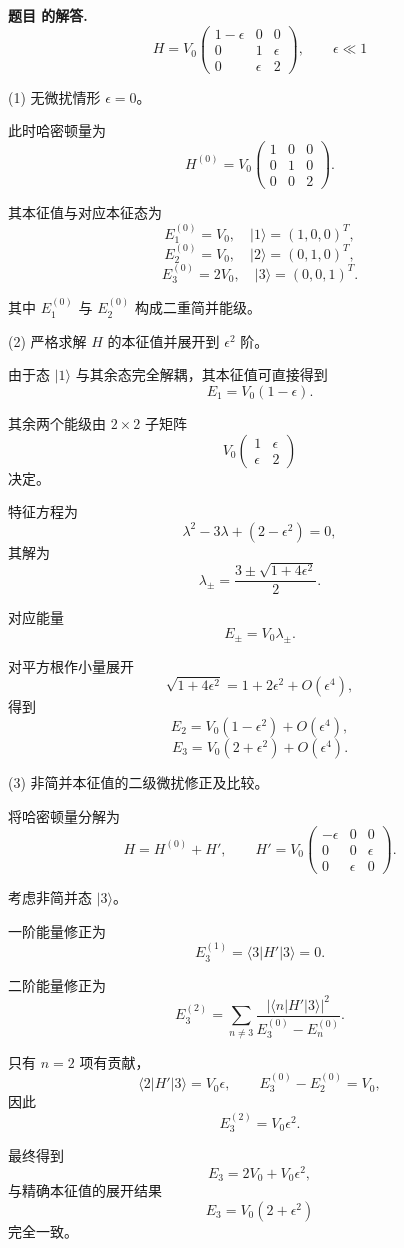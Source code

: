 \documentclass[12pt, a4paper, oneside]{ctexart}
\newcounter{problemname}
\newenvironment{solution}
  {\par\noindent\textbf{题目 \theproblemname 的解答. }}
  {\par}
\begin{document}
\begin{solution}
  \[
H = V_0
\begin{pmatrix}
1-\epsilon & 0 & 0 \\
0 & 1 & \epsilon \\
0 & \epsilon & 2
\end{pmatrix},
\qquad \epsilon \ll 1
\]

(1) 无微扰情形 $\epsilon=0$。

此时哈密顿量为
\[
H^{(0)} = V_0
\begin{pmatrix}
1 & 0 & 0 \\
0 & 1 & 0 \\
0 & 0 & 2
\end{pmatrix}.
\]

其本征值与对应本征态为
\[
E_1^{(0)} = V_0, \quad |1\rangle = (1,0,0)^T,
\]
\[
E_2^{(0)} = V_0, \quad |2\rangle = (0,1,0)^T,
\]
\[
E_3^{(0)} = 2V_0, \quad |3\rangle = (0,0,1)^T.
\]

其中 $E_1^{(0)}$ 与 $E_2^{(0)}$ 构成二重简并能级。

\bigskip

(2) 严格求解 $H$ 的本征值并展开到 $\epsilon^2$ 阶。

由于态 $|1\rangle$ 与其余态完全解耦，其本征值可直接得到
\[
E_1 = V_0(1-\epsilon).
\]

其余两个能级由 $2\times2$ 子矩阵
\[
V_0
\begin{pmatrix}
1 & \epsilon \\
\epsilon & 2
\end{pmatrix}
\]
决定。

特征方程为
\[
\lambda^2 - 3\lambda + (2-\epsilon^2)=0,
\]
其解为
\[
\lambda_{\pm}=\frac{3\pm\sqrt{1+4\epsilon^2}}{2}.
\]

对应能量
\[
E_{\pm}=V_0\lambda_{\pm}.
\]

对平方根作小量展开
\[
\sqrt{1+4\epsilon^2}=1+2\epsilon^2+O(\epsilon^4),
\]
得到
\[
E_2 = V_0(1-\epsilon^2)+O(\epsilon^4),
\]
\[
E_3 = V_0(2+\epsilon^2)+O(\epsilon^4).
\]

\bigskip

(3) 非简并本征值的二级微扰修正及比较。

将哈密顿量分解为
\[
H = H^{(0)} + H',
\qquad
H' = V_0
\begin{pmatrix}
-\epsilon & 0 & 0 \\
0 & 0 & \epsilon \\
0 & \epsilon & 0
\end{pmatrix}.
\]

考虑非简并态 $|3\rangle$。

一阶能量修正为
\[
E_3^{(1)}=\langle 3|H'|3\rangle=0.
\]

二阶能量修正为
\[
E_3^{(2)}=\sum_{n\neq3}\frac{|\langle n|H'|3\rangle|^2}
{E_3^{(0)}-E_n^{(0)}}.
\]

只有 $n=2$ 项有贡献，
\[
\langle 2|H'|3\rangle=V_0\epsilon,
\qquad
E_3^{(0)}-E_2^{(0)}=V_0,
\]
因此
\[
E_3^{(2)}=V_0\epsilon^2.
\]

最终得到
\[
E_3 = 2V_0 + V_0\epsilon^2,
\]
与精确本征值的展开结果
\[
E_3 = V_0(2+\epsilon^2)
\]
完全一致。

\end{solution}
\end{document}
